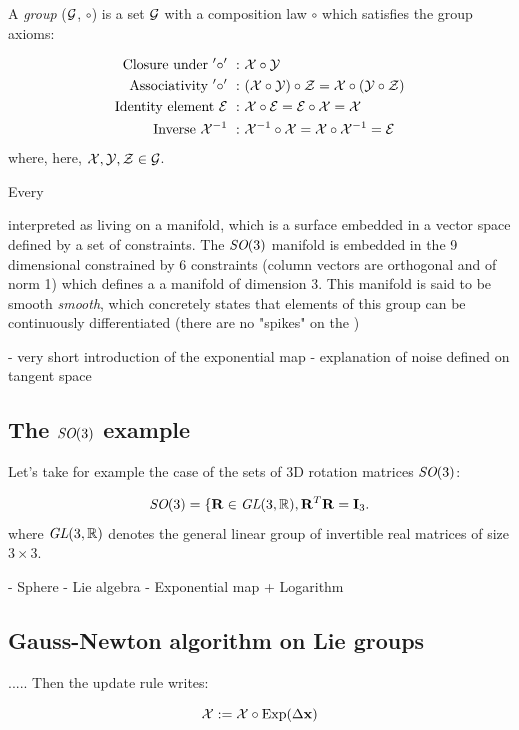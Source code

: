 A \textit{group} ($\mathcal{G}$, $\circ$) is a set $\mathcal{G}$ with a composition law $\circ$ which satisfies the group axioms:

\begin{align}
    \text{Closure under}~'\circ'~:&~\mathcal{X} \circ \mathcal{Y} \\ 
    \text{Associativity}~'\circ'~:&~(\mathcal{X} \circ \mathcal{Y}) \circ \mathcal{Z} = \mathcal{X} \circ (\mathcal{Y} \circ \mathcal{Z}) \\ 
    \text{Identity element}~\mathcal{E}~:&~\mathcal{X} \circ \mathcal{E} = \mathcal{E} \circ \mathcal{X} = \mathcal{X} \\ 
    \text{Inverse}~\mathcal{X}^{-1}~:&~\mathcal{X}^{-1} \circ \mathcal{X} = \mathcal{X} \circ \mathcal{X}^{-1} = \mathcal{E}
\end{align}
where, here, $\mathcal{X},\mathcal{Y},\mathcal{Z} \in \mathcal{G}$.

Every




interpreted as living on a manifold, which is a surface embedded in a vector space defined by a set of constraints. 
The $\textit{SO}(3)$ manifold is embedded in the 9 dimensional constrained by 6 constraints (column vectors are orthogonal and of norm 1) which defines a 
a manifold of dimension 3. This manifold is said to be smooth \textit{smooth}, which concretely states that elements of this group can be 
continuously differentiated (there are no "spikes" on the )

  
- very short introduction of the exponential map
- explanation of noise defined on tangent space

\subsection{The $\textit{SO}(3)$ example}
Let's take for example the case of the sets of 3D rotation matrices $\textit{SO}(3)$:

\begin{equation*}
    \textit{SO}(3) = \{ {\bf R} \in \textit{GL}(3,\mathbb{R}), {\bf R}^T {\bf R}  = {\bf I}_3.
\end{equation*}
where $\textit{GL}(3,\mathbb{R})$ denotes the general linear group of invertible real matrices of size $3 \times 3$.

- Sphere
- Lie algebra
- Exponential map + Logarithm

\subsection{Gauss-Newton algorithm on Lie groups}


.....
Then the update rule writes:

\begin{equation}
    \mathcal{X} := \mathcal{X} \circ \operatorname*{Exp}(\Delta {\bf x})
\end{equation}

